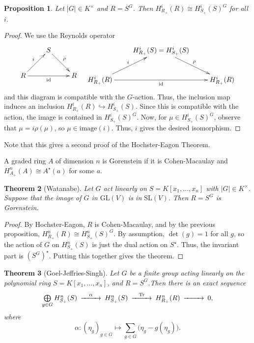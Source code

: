 \documentclass[12pt]{amsart}
\newtheorem{theorem}{Theorem}[section]
\newtheorem{proposition}[theorem]{Proposition}
\theoremstyle{definition}
\numberwithin{equation}{theorem}
\def\Tr{\operatorname{Tr}}
\def\mapsto{\longmapsto}
\begin{document}
\begin{proposition} Let $|G|\in K^\times$ and $R=S^G$. Then $H^i_{R_+}(R) \cong H^i_{S_+}(S)^G$ for all $i$.
\end{proposition}
\begin{proof}
We use the Reynolds operator
\[ \xymatrix{ & S \ar[dr]^-{\rho} & \\
R \ar[ur]^-{i} \ar[rr]_-{\mathrm{id}} && R} \quad  \xymatrix{ & H^i_{R_+}(S) = H^i_{S_+}(S)  \ar[dr]^-{\rho} & \\
H^i_{R_+}(R) \ar[ur]^-{i} \ar[rr]_-{\mathrm{id}} && H^i_{R_+}(R)}\]
and this diagram is compatible with the $G$-action.
Thus, the inclusion map induces an inclusion $H^i_{R_+}(R) \hookrightarrow H^i_{S_+}(S)$. Since this is compatible with the action, the image is contained in $H^i_{S_+}(S)^G$. Now, for $\mu\in H^i_{S_+}(S)^G$, observe that $\mu = i \rho(\mu)$, so $\mu \in \mathrm{image}(i)$. Thus, $i$ gives the desired isomorphism.
\end{proof}


Note that this gives a second proof of the Hochster-Eagon Theorem.

A graded ring $A$ of dimension $n$ is Gorenstein if it is Cohen-Macaulay and $H^n_{A_+}(A)\cong A^\star(a)$ for some $a$.


\begin{theorem}[Watanabe] Let $G$ act linearly on $S=K[x_1,\dots,x_n]$ with $|G|\in K^\times$. Suppose that the image of $G$ in $\mathrm{GL}(V)$ is in $\mathrm{SL}(V)$. Then $R=S^G$ is Gorenstein.
\end{theorem}
\begin{proof}
By Hochster-Eagon, $R$ is Cohen-Macaulay, and by the previous proposition, $H^n_{R_+}(R) \cong H^n_{S_+}(S)^G$. By assumption, $\det(g)=1$ for all $g$, so the action of $G$ on $H^n_{S_+}(S)$ is just the dual action on $S^\star$. Thus, the invariant part is $(S^G)^\star$. Putting this together gives the theorem.
\end{proof}


\begin{theorem}[Goel-Jeffries-Singh]
\label{theorem:main}
Let $G$ be a finite group acting linearly on the polynomial ring $S= K[x_1,\dots,x_n]$, and $R=S^G$.Then there is an exact sequence
\[
\CD
\bigoplus\limits_{g \in G} H^n_{S_+}(S) @>\alpha>> H^n_{S_+}(S) @>\Tr>> H^n_{R_+}(R) @>>> 0,
\endCD
\]
where \[
\alpha\colon(\eta_g)_{g\in G} \mapsto \sum_{g\in G}\big(\eta_g - g(\eta_g)\big).
\]
\end{theorem}
\end{document}
